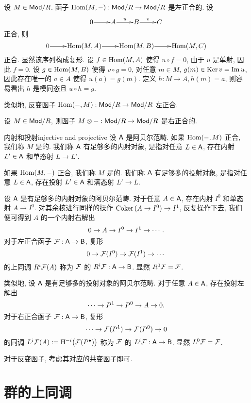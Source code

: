 \begin{example}
设 $M\in{\mathsf{Mod}}/R$. 函子 ${\mathrm{Hom}}(M,-):{\mathsf{Mod}}/R\to{\mathsf{Mod}}/R$ 是左正合的. 设
  \[\xymatrix@1{0\ar[r]&A\ar[r]^u&B\ar[r]^v&C}\]
正合, 则
  \[\xymatrix@1{0\ar[r]&\Hom(M,A)\ar[r]&\Hom(M,B)\ar[r]&\Hom(M,C)}\]
正合. 显然该序列构成复形. 设 $f\in {\mathrm{Hom}}(M,A)$ 使得 $u\circ f=0$, 由于 $u$ 是单射, 因此 $f=0$. 设 $g\in {\mathrm{Hom}}(M,B)$ 使得 $v\circ g=0$, 对任意 $m\in M$, $g(m)\in {\mathrm{Ker}\,} v={\mathrm{Im}\,} u$, 因此存在唯一的 $a\in A$ 使得 $u(a)=g(m)$. 定义 $h:M\to A,h(m)=a$, 则容易看出 $h$ 是模同态且 $u\circ h=g$. 

类似地, 反变函子 ${\mathrm{Hom}}(-,M):{\mathsf{Mod}}/R\to{\mathsf{Mod}}/R$ 左正合. 
\end{example}

\begin{example}
设 $M\in{\mathsf{Mod}}/R$, 则函子 $M\otimes-:{\mathsf{Mod}}/R\to{\mathsf{Mod}}/R$ 是右正合的.
\end{example}

\begin{definition}{内射和投射}{injective and projective}
设 ${\mathsf{A}}$ 是阿贝尔范畴. 如果 ${\mathrm{Hom}}(-,M)$ 正合, 我们称 $M$ 是的. 我们称 ${\mathsf{A}}$ 有足够多的内射对象, 是指对任意 $L\in{\mathsf{A}}$, 存在内射 $L'\in {\mathsf{A}}$ 和单态射 $L\to L'$.

如果 ${\mathrm{Hom}}(M,-)$ 正合, 我们称 $M$ 是的. 我们称 ${\mathsf{A}}$ 有足够多的投射对象, 是指对任意 $L\in{\mathsf{A}}$, 存在投射 $L'\in {\mathsf{A}}$ 和满态射 $L'\to L$.
\end{definition}

设 ${\mathsf{A}}$ 是有足够多的内射对象的阿贝尔范畴. 对于任意 $A\in{\mathsf{A}}$, 存在内射 $I^0$ 和单态射 $A\to I^0$. 对其余核进行同样的操作 ${\mathrm{Coker}\,}(A\to I^0)\to I^1$, 反复操作下去, 我们便可得到 $A$ 的一个内射右解出
  \[0\rightarrow A\rightarrow I^0\rightarrow I^1\rightarrow \cdots.\]
对于左正合函子 ${\mathcal{F}}:{\mathsf{A}}\to {\mathsf{B}}$, 复形
  \[0\rightarrow {\mathcal{F}}(I^0)\rightarrow {\mathcal{F}}(I^1)\rightarrow \cdots\]
的上同调 $R^i{\mathcal{F}}(A)$ 称为 ${\mathcal{F}}$ 的 $R^i{\mathcal{F}}:{\mathsf{A}}\to {\mathsf{B}}$. 显然 $R^0{\mathcal{F}}={\mathcal{F}}$.

类似地, 设 ${\mathsf{A}}$ 是有足够多的投射对象的阿贝尔范畴. 对于任意 $A\in{\mathsf{A}}$, 存在投射左解出
  \[\cdots\rightarrow P^1\rightarrow P^0\rightarrow A\rightarrow 0.\]
对于右正合函子 ${\mathcal{F}}:{\mathsf{A}}\to {\mathsf{B}}$, 复形
  \[\cdots\rightarrow {\mathcal{F}}(P^1)\rightarrow {\mathcal{F}}(P^0)\rightarrow 0\]
的同调 $L^i{\mathcal{F}}(A):={\mathrm{H}}^{-i}\bigl({\mathcal{F}}(P^\bullet)\bigr)$ 称为 ${\mathcal{F}}$ 的 $L^i{\mathcal{F}}:{\mathsf{A}}\to {\mathsf{B}}$. 显然 $L^0{\mathcal{F}}={\mathcal{F}}$.

对于反变函子, 考虑其对应的共变函子即可.

\section{群的上同调}

